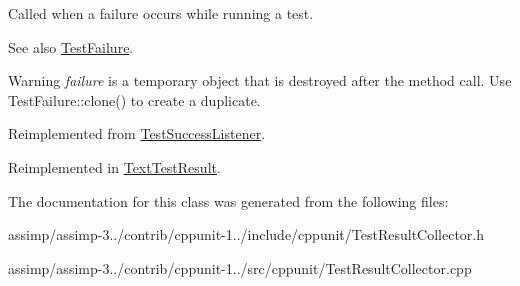 Called when a failure occurs while running a test. 

\begin{DoxySeeAlso}{See also}
\hyperlink{class_test_failure}{Test\+Failure}. 
\end{DoxySeeAlso}
\begin{DoxyWarning}{Warning}
{\itshape failure} is a temporary object that is destroyed after the method call. Use Test\+Failure\+::clone() to create a duplicate. 
\end{DoxyWarning}


Reimplemented from \hyperlink{class_test_success_listener_a912bb5ea408b2be5b39cfb45e1bb402f}{Test\+Success\+Listener}.



Reimplemented in \hyperlink{class_text_test_result_a05d3b0e8e51b3430092166bbc3d17708}{Text\+Test\+Result}.



The documentation for this class was generated from the following files\+:\begin{DoxyCompactItemize}
\item 
assimp/assimp-\/3../contrib/cppunit-\/1../include/cppunit/Test\+Result\+Collector.\+h\item 
assimp/assimp-\/3../contrib/cppunit-\/1../src/cppunit/Test\+Result\+Collector.\+cpp\end{DoxyCompactItemize}
